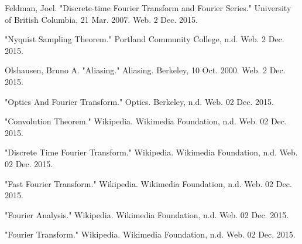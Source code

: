 \documentclass{article}
\begin{document}
\begin{thebibliography}{9}

	Feldman, Joel. "Discrete-time Fourier Transform and Fourier Series." University of British Columbia, 21 Mar. 2007. Web. 2 Dec. 2015.

	"Nyquist Sampling Theorem." Portland Community College, n.d. Web. 2 Dec. 2015.

	Olshausen, Bruno A. "Aliasing." Aliasing. Berkeley, 10 Oct. 2000. Web. 2 Dec. 2015.

	"Optics And Fourier Transform." Optics. Berkeley, n.d. Web. 02 Dec. 2015.
	
	"Convolution Theorem." Wikipedia. Wikimedia Foundation, n.d. Web. 02 Dec. 2015.
	
	"Discrete Time Fourier Transform." Wikipedia. Wikimedia Foundation, n.d. Web. 02 Dec. 2015.
	
	"Fast Fourier Transform." Wikipedia. Wikimedia Foundation, n.d. Web. 02 Dec. 2015.
	
	"Fourier Analysis." Wikipedia. Wikimedia Foundation, n.d. Web. 02 Dec. 2015.
	
	"Fourier Transform." Wikipedia. Wikimedia Foundation, n.d. Web. 02 Dec. 2015.
\end{thebibliography}
\end{document}

